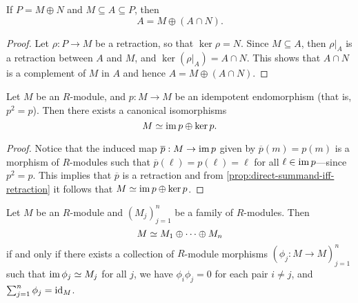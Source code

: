 \begin{corollary}
    \label{cor:direct-summand-iff-retraction}
    If \(P = M \oplus N\) and \(M \subseteq A \subseteq P\), then
    \[
        A = M \oplus (A \cap N).
    \]
\end{corollary}

\begin{proof}
    Let \(\rho: P \to M\) be a retraction, so that \(\ker \rho = N\). Since
    \(M \subseteq A\), then \(\rho|_A\) is a retraction between \(A\) and \(M\), and
    \(\ker(\rho|_A) = A \cap N\). This shows that \(A \cap N\) is a complement of
    \(M\) in \(A\) and hence \(A = M \oplus (A \cap N)\).
\end{proof}

\begin{corollary}
    \label{cor:module-iso-ker-im}
    Let \(M\) be an \(R\)-module, and \(p: M \to M\) be an idempotent
    endomorphism (that is, \(p^2 = p\)). Then there exists a canonical isomorphisms
    \[
        M \simeq \operatorname{im} p \oplus \ker p.
    \]
\end{corollary}

\begin{proof}
    Notice that the induced map \(\overline{p}: M \to \operatorname{im} p\) given by
    \(\overline{p}(m) = p(m)\) is a morphism of \(R\)-modules such that
    \(\overline{p}(\ell) = p(\ell) = \ell\) for all \(\ell \in \operatorname{im} p\)---since
    \(p^2 = p\). This implies that \(\overline{p}\) is a retraction and from
    \cref{prop:direct-summand-iff-retraction} it follows that
    \(M \simeq \operatorname{im} p \oplus \ker p\).
\end{proof}

\begin{proposition}
    \label{prop:direct-summand-decomposition}
    Let \(M\) be an \(R\)-module and \((M_j)_{j=1}^n\) be a family of
    \(R\)-modules. Then
    \[
        M \simeq M_1 \oplus \dots \oplus M_n
    \]
    if and only if there exists a collection of \(R\)-module morphisms
    \((\phi_j: M \to M)_{j=1}^n\) such that \(\operatorname{im} \phi_j \simeq M_j\) for all \(j\),
    we have \(\phi_i \phi_j = 0\) for each pair \(i \neq j\), and
    \(\sum_{j = 1}^n \phi_j = \operatorname{id}_M\).
\end{proposition}

